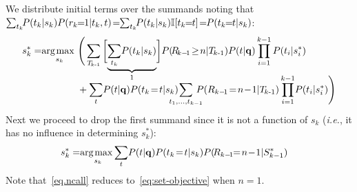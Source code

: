 We distribute initial terms over the summands noting that 
$\sum_{t_k} \!\! P(t_k|s_k) P(r_k\!\!=\!\!1|t_k,t) \! = \!\! \sum_{t_k} \!\! P(t_k|s_k) \I[t_k\!\!=\!\!t] \! = \!\! P(t_k\!\!=\!\!t|s_k)$:
\begin{align}
 s_k^* = & \argmax_{s_k} \Bigg( \sum_{\TlessK} \bigg[ \mbox{$\underbrace{ \sum_{t_k} \!P(t_k|s_k) }_{1}$} \bigg] P(\!R_{\!k-\!1}\!\geq\!n|\TlessK) P(t|\vec{q}) \prod_{i=1}^{k-1} P(t_i|s_i^*) \nonumber \\[-3.5mm]
  & \hspace{13mm} + \sum_{t} \!P(t|\vec{q}) P(t_k\!=\!t|s_k) \hspace{-4mm} \sum_{t_1, \dots, t_{k-1}} \hspace{-3mm} P(R_{k-\!1}\!=\!n\!-\!1|\TlessK) \prod_{i=1}^{k-1} \!P(t_i|s_i^*) \Bigg) \nonumber
\end{align}
Next we proceed
to drop the first summand since it is not a function of $s_k$ (\emph{i.e.},
it has no influence in determining $s_k^*$):
\begin{align}
s_k^* = & \argmax_{s_k} \!\sum_{t} \!P(t|\vec{q}) P(t_k\!=\!t|s_k) P(\!R_{k-\!1}\!\!=\!n\!-\!1|S_{k-1}^*) \label{eq.ncall}
\end{align}
Note that~\eqref{eq.ncall} reduces to~\eqref{eq:set-objective} when $n=1$.

